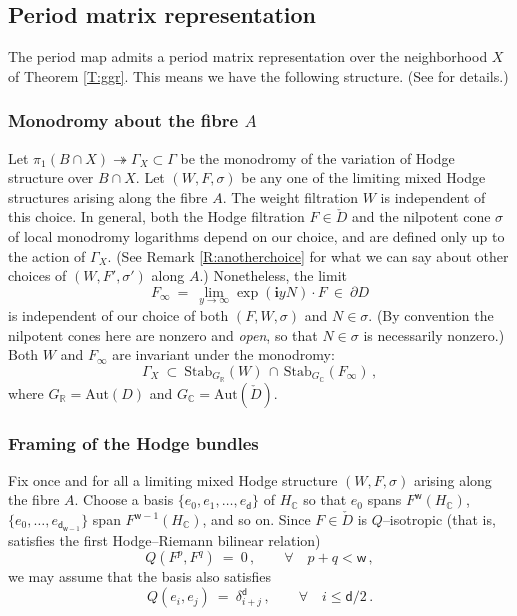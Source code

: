 \documentclass[12pt]{amsart}
\numberwithin{equation}{section}
\numberwithin{table}{section}
\def\d{\delta}
\def\s{\sigma}
\def\tAut{\mathrm{Aut}}
\def\bC{\mathbb{C}}
\def\bi{\mathbf{i}}
\def\bR{\mathbb{R}}
\def\tStab{\mathrm{Stab}}
\def\sfw{\mathsf{w}}
\def\sur{\twoheadrightarrow}
\theoremstyle{definition}
\theoremstyle{definition}
\theoremstyle{remark}
\def\sfd{\mathsf{d}}
\begin{document}
\subsection{Period matrix representation} \label{S:pmr}

The period map admits a period matrix representation over the neighborhood $X$ of Theorem \ref{T:ggr}.  This means we have the following structure.  (See \cite[\S4]{GGR-part1} for details.)   

\subsubsection{Monodromy about the fibre $A$}

Let $\pi_1(B \cap X) \sur \Gamma_X \subset \Gamma$ be the monodromy of the variation of Hodge structure over $B \cap X$.  Let $(W,F,\s)$ be any one of the limiting mixed Hodge structures arising along the fibre $A$.  The weight filtration $W$ is independent of this choice.  In general, both the Hodge filtration $F \in \check D$ and the nilpotent cone $\s$ of local monodromy logarithms depend on our choice, and are defined only up to the action of $\Gamma_X$.  (See Remark \ref{R:anotherchoice} for what we can say about other choices of $(W,F',\s')$ along $A$.)  Nonetheless, the limit
\[
  F_\infty \ = \ \lim_{y\to\infty} \exp(\bi y N) \cdot F
  \ \in \ \partial D
\]
is independent of our choice of both $(F,W,\s)$ and $N \in \s$.  (By convention the nilpotent cones here are nonzero and \emph{open}, so that $N \in \s$ is necessarily nonzero.)  Both $W$ and $F_\infty$ are invariant under the monodromy:
\begin{equation}\label{E:GammaX}
  \Gamma_X \ \subset \ \tStab_{G_\bR}(W) \,\cap\, 
  \tStab_{G_\bC}(F_\infty) \,, 
\end{equation}
where $G_\bR = \tAut(D)$ and $G_\bC = \tAut(\check D)$.

\subsubsection{Framing of the Hodge bundles} \label{S:framing}

Fix once and for all a limiting mixed Hodge structure $(W,F,\s)$ arising along the fibre $A$.  Choose a basis $\{e_0,e_1,\ldots,e_\sfd\}$ of $H_\bC$ so that $e_0$ spans $F^\sfw(H_\bC)$, $\{e_0,\ldots,e_{\sfd_{\sfw-1}}\}$ span $F^{\sfw-1}(H_\bC)$, and so on.  Since $F \in \check D$ is $Q$--isotropic (that is, satisfies the first Hodge--Riemann bilinear relation)
\[
  Q(F^p , F^q) \ = \ 0 \,,\qquad \forall \quad p+q < \sfw \,,
\]
we may assume that the basis also satisfies
\begin{equation}\label{E:Q}
	Q(e_i,e_j) \ = \ \d^\sfd_{i+j} \,,
	\qquad \forall \quad i \le \sfd/2 \,.
\end{equation}
\end{document}
